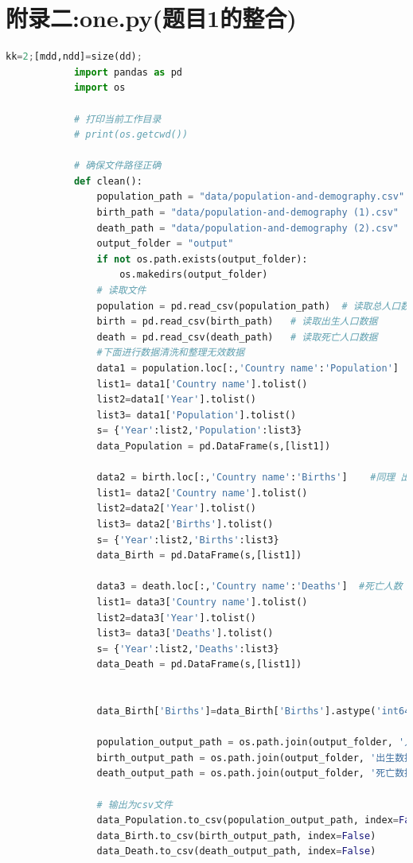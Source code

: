 \documentclass{ctexart}
\begin{document}
    \section{附录二:one.py(题目1的整合)}
    \tiny
        \begin{lstlisting}[language=Python] %设置不同语言即可。
            kk=2;[mdd,ndd]=size(dd);
            import pandas as pd
            import os

            # 打印当前工作目录
            # print(os.getcwd())

            # 确保文件路径正确
            def clean():
                population_path = "data/population-and-demography.csv"
                birth_path = "data/population-and-demography (1).csv"
                death_path = "data/population-and-demography (2).csv"
                output_folder = "output"
                if not os.path.exists(output_folder):
                    os.makedirs(output_folder)
                # 读取文件
                population = pd.read_csv(population_path)  # 读取总人口数数据
                birth = pd.read_csv(birth_path)   # 读取出生人口数据
                death = pd.read_csv(death_path)   # 读取死亡人口数据
                #下面进行数据清洗和整理无效数据
                data1 = population.loc[:,'Country name':'Population']    #去年龄段 保留总人口数
                list1= data1['Country name'].tolist()
                list2=data1['Year'].tolist()
                list3= data1['Population'].tolist()
                s= {'Year':list2,'Population':list3}
                data_Population = pd.DataFrame(s,[list1])              #转换国家或地区为行标签

                data2 = birth.loc[:,'Country name':'Births']    #同理 出生人数
                list1= data2['Country name'].tolist()
                list2=data2['Year'].tolist()
                list3= data2['Births'].tolist()
                s= {'Year':list2,'Births':list3}
                data_Birth = pd.DataFrame(s,[list1]) 

                data3 = death.loc[:,'Country name':'Deaths']  #死亡人数
                list1= data3['Country name'].tolist()
                list2=data3['Year'].tolist()
                list3= data3['Deaths'].tolist()
                s= {'Year':list2,'Deaths':list3}
                data_Death = pd.DataFrame(s,[list1]) 


                data_Birth['Births']=data_Birth['Births'].astype('int64')   #修改数据类型为整形

                population_output_path = os.path.join(output_folder, '人口数据(已清洗).csv')
                birth_output_path = os.path.join(output_folder, '出生数据(已清洗).csv')
                death_output_path = os.path.join(output_folder, '死亡数据(已清洗).csv')

                # 输出为csv文件
                data_Population.to_csv(population_output_path, index=False)
                data_Birth.to_csv(birth_output_path, index=False)
                data_Death.to_csv(death_output_path, index=False)
                
        \end{lstlisting}
    \newpage
\end{document}
